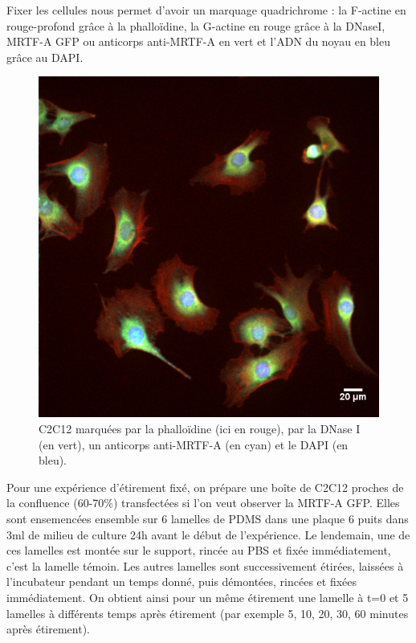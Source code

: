 \documentclass{report}
\begin{document}
	Fixer les cellules nous permet d'avoir un marquage quadrichrome : la F-actine en rouge-profond grâce à la phalloïdine, la G-actine en rouge grâce à la DNaseI, MRTF-A GFP ou anticorps anti-MRTF-A en vert et l'ADN du noyau en bleu grâce au DAPI. 
	
	\begin{figure}
	\includegraphics[scale=0.3]{2014-06-18-Et10-0-1(RGB).png}
	\caption{C2C12 marquées par la phalloïdine (ici en rouge), par la DNase I (en vert), un anticorps anti-MRTF-A (en cyan) et le DAPI (en bleu).}
	\end{figure}
	
	Pour une expérience d'étirement fixé, on prépare une boîte de C2C12 proches de la confluence (60-70\%) transfectées si l'on veut observer la MRTF-A GFP. Elles sont ensemencées ensemble sur 6 lamelles de PDMS dans une plaque 6 puits dans 3ml de milieu de culture 24h avant le début de l'expérience. Le lendemain, une de ces lamelles est montée sur le support, rincée au PBS et fixée immédiatement, c'est la lamelle témoin. Les autres lamelles sont successivement étirées, laissées à l'incubateur pendant un temps donné, puis démontées, rincées et fixées immédiatement. On obtient ainsi pour un même étirement une lamelle à t=0 et 5 lamelles à différents temps après étirement (par exemple 5, 10, 20, 30, 60 minutes après étirement). 
	
\end{document}
